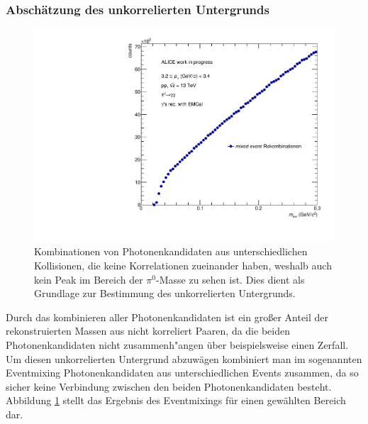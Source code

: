 \documentclass[11pt]{article}
\begin{document}
	\subsubsection{Absch{\"a}tzung des unkorrelierten Untergrunds}
	\label{sssec:num3}

	\begin{figure}[tbp]
		\centering
		\includegraphics[width=.7\linewidth]{hUncorrBkg.pdf}
		\caption{Kombinationen von Photonenkandidaten aus unterschiedlichen Kollisionen, die keine Korrelationen zueinander haben, weshalb auch kein Peak im Bereich der $\pi^{0}$-Masse zu sehen ist. Dies dient als Grundlage zur Bestimmung des unkorrelierten Untergrunds.}
		\label{figUncorrBkg}
	\end{figure}

	Durch das kombinieren aller Photonenkandidaten ist ein gro{\ss}er Anteil der rekonstruierten Massen aus nicht korreliert Paaren, da die beiden Photonenkandidaten nicht zusammenh{"a}ngen {\"u}ber beispielsweise einen Zerfall. Um diesen unkorrelierten Untergrund abzuw{\"a}gen kombiniert man im sogenannten Eventmixing Photonenkandidaten aus unterschiedlichen Events zusammen, da so sicher keine Verbindung zwischen den beiden Photonenkandidaten besteht. Abbildung \ref{figUncorrBkg} stellt das Ergebnis des Eventmixings f{\"u}r einen gew{\"a}hlten Bereich dar.
\end{document}
